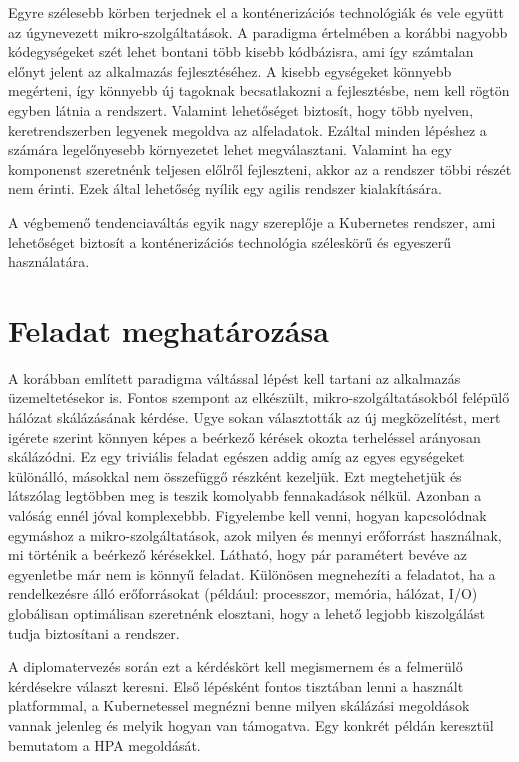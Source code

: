 Egyre szélesebb körben terjednek el a konténerizációs technológiák és vele együtt az úgynevezett mikro-szolgáltatások.
A paradigma értelmében a korábbi nagyobb kódegységeket szét lehet bontani több kisebb kódbázisra, ami így számtalan előnyt jelent az alkalmazás fejlesztéséhez.
A kisebb egységeket könnyebb megérteni, így könnyebb új tagoknak becsatlakozni a fejlesztésbe, nem kell rögtön egyben látnia a rendszert.
Valamint lehetőséget biztosít, hogy több nyelven, keretrendszerben legyenek megoldva az alfeladatok. Ezáltal minden lépéshez a számára legelőnyesebb környezetet lehet megválasztani. Valamint ha egy komponenst szeretnénk teljesen előlről fejleszteni, akkor az a rendszer többi részét nem érinti.
Ezek által lehetőség nyílik egy agilis rendszer kialakítására.

A végbemenő tendenciaváltás egyik nagy szereplője a Kubernetes rendszer, ami lehetőséget biztosít a konténerizációs technológia széleskörű és egyeszerű használatára.

\section{Feladat meghatározása}
A korábban említett paradigma váltással lépést kell tartani az alkalmazás üzemeltetésekor is. Fontos szempont az elkészült, mikro-szolgáltatásokból felépülő hálózat skálázásának kérdése. Ugye sokan választották az új megközelítést, mert igérete szerint könnyen képes a beérkező kérések okozta terheléssel arányosan skálázódni. Ez egy triviális feladat egészen addig amíg az egyes egységeket különálló, másokkal nem összefüggő részként kezeljük. Ezt megtehetjük és látszólag legtöbben meg is teszik komolyabb fennakadások nélkül. 
Azonban a valóság ennél jóval komplexebbb. Figyelembe kell venni, hogyan kapcsolódnak egymáshoz a mikro-szolgáltatások, azok milyen és mennyi erőforrást használnak, mi történik a beérkező kérésekkel.
Látható, hogy pár paramétert bevéve az egyenletbe már nem is könnyű feladat. Különösen megnehezíti a feladatot, ha a rendelkezésre álló erőforrásokat (például: processzor, memória, hálózat, I/O) globálisan optimálisan szeretnénk elosztani, hogy a lehető legjobb kiszolgálást tudja biztosítani a rendszer. 

A diplomatervezés során ezt a kérdéskört kell megismernem és a felmerülő kérdésekre választ keresni. Első lépésként fontos tisztában lenni a használt platformmal, a Kubernetessel megnézni benne milyen skálázási megoldások vannak jelenleg és melyik hogyan van támogatva. Egy konkrét példán keresztül bemutatom a HPA megoldását. 

